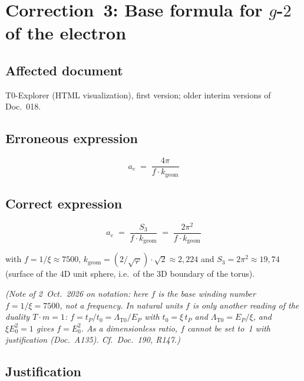 \section{\texorpdfstring{Correction~3: Base formula for $g$-$2$ of the electron}{Correction 3: Base formula for g-2 of the electron}}

\subsection*{Affected document}

T0-Explorer (HTML visualization), first version; older interim versions
of Doc.~018.

\subsection*{Erroneous expression}

\begin{equation}
  a_e \;=\; \frac{4\pi}{f \cdot k_{\text{geom}}}
  \tag{old -- wrong}
\end{equation}

\subsection*{Correct expression}

\begin{equation}
  \boxed{
    a_e \;=\; \frac{S_3}{f \cdot k_{\text{geom}}}
    \;=\; \frac{2\pi^2}{f \cdot k_{\text{geom}}}
  }
  \tag{190.4}
\end{equation}

with $f = 1/\xi \approx 7500$, $k_{\text{geom}} = (2/\sqrt{\varphi})\cdot\sqrt{2} \approx 2{,}224$
and $S_3 = 2\pi^2 \approx 19{,}74$ (surface of the 4D unit sphere,
i.e.\ of the 3D boundary of the torus).

\textit{(Note of 2~Oct.~2026 on notation: here $f$ is the base winding number $f = 1/\xi = 7500$, not a frequency. In natural units $f$ is only another reading of the duality $T\cdot m = 1$: $f = t_P/t_0 = \Lambda_{\text{T0}}/E_P$ with $t_0 = \xi\,t_P$ and $\Lambda_{\text{T0}} = E_P/\xi$, and $\xi E_0^2 = 1$ gives $f = E_0^2$. As a dimensionless ratio, $f$ cannot be set to~1 with justification (Doc.~A135). Cf.\ Doc.~190, R147.)}

\subsection*{Justification}

